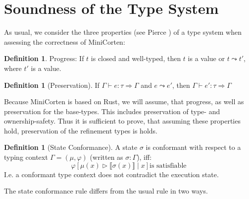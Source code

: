 \documentclass[twoside, english]{sdqthesis}
\newcommand{\bbracket}[1]{\llbracket #1 \rrbracket}
\theoremstyle{definition}
\newtheorem{definition}[theorem]{Definition}
\begin{document}

\fi

\section{Soundness of the Type System}

As usual, we consider the three properties (see Pierce \cite[p. 95, p.167]{pierce_types_2002}) of a type system when assessing the correctness of MiniCorten:

\begin{definition}
  Progress:
    If $t$ is closed and well-typed, then $t$ is a value or $t \leadsto t'$, where $t'$ is a value.
\end{definition}

\begin{definition}[Preservation]
  If $\Gamma \vdash e : \tau \Rightarrow \Gamma$ and $e \leadsto e'$, then $\Gamma \vdash e' : \tau \Rightarrow \Gamma$
\end{definition}

Because MiniCorten is based on Rust, we will assume, that progress, as well as preservation for the base-types. This includes preservation of type- and ownership-safety. Thus it is sufficient to prove, that assuming these properties hold, preservation of the refinement types is holds.


\begin{definition}[State Conformance]
  A state $\sigma$ is conformant with respect to a typing context $\Gamma = (\mu, \varphi)$ (written as $\sigma : \Gamma$), iff:
  $$
    \varphi[\mu(x) \triangleright \bbracket{\sigma(x)} \mid x] \text{is satisfiable}
  $$
  I.e. a conformant type context does not contradict the execution state.
\end{definition}

The state conformance rule differs from the usual rule in two ways.
\end{document}
